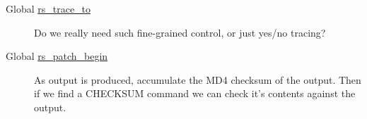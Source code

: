 \label{todo__todo000004}
\hypertarget{todo__todo000004}{}
 \begin{description}
\item[Global \hyperlink{librsync_8h_c41a6f21adb5c2f1e085550b84136f19}{rs\_\-trace\_\-to} ]Do we really need such fine-grained control, or just yes/no tracing? \end{description}


\label{todo__todo000002}
\hypertarget{todo__todo000002}{}
 \begin{description}
\item[Global \hyperlink{librsync_8h_dbbe2d04efe90a1ad09397ca2e77bfa9}{rs\_\-patch\_\-begin} ]As output is produced, accumulate the MD4 checksum of the output. Then if we find a CHECKSUM command we can check it's contents against the output.

\end{description}
